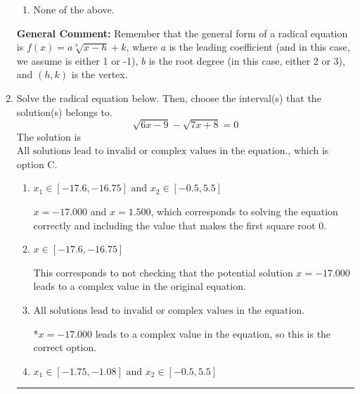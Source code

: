 \documentclass{extbook}[14pt]
\newcommand{\litem}[1]{\item #1

\rule{\textwidth}{0.4pt}}
\begin{document}
\begin{enumerate}
{\begin{enumerate}[label=\Alph*.]
\item None of the above.\end{enumerate}
\textbf{General Comment:} Remember that the general form of a radical equation is $ f(x) = a \sqrt[b]{x - h} + k $, where $a$ is the leading coefficient (and in this case, we assume is either 1 or -1), $b$ is the root degree (in this case, either 2 or 3), and $(h, k)$ is the vertex.
}
\litem{
Solve the radical equation below. Then, choose the interval(s) that the solution(s) belongs to.
\[ \sqrt{6 x - 9} - \sqrt{7 x + 8} = 0 \]The solution is \( \text{All solutions lead to invalid or complex values in the equation.} \), which is option C.\begin{enumerate}[label=\Alph*.]
\item \( x_1 \in [-17.6, -16.75] \text{ and } x_2 \in [-0.5,5.5] \)

$x = -17.000$ and $x = 1.500$, which corresponds to solving the equation correctly and including the value that makes the first square root 0.
\item \( x \in [-17.6,-16.75] \)

This corresponds to not checking that the potential solution $x = -17.000$ leads to a complex value in the original equation.
\item \( \text{All solutions lead to invalid or complex values in the equation.} \)

*$x = -17.000$ leads to a complex value in the equation, so this is the correct option.
\item \( x_1 \in [-1.75, -1.08] \text{ and } x_2 \in [-0.5,5.5] \)


\end{enumerate}}
\end{enumerate}
\end{document}
